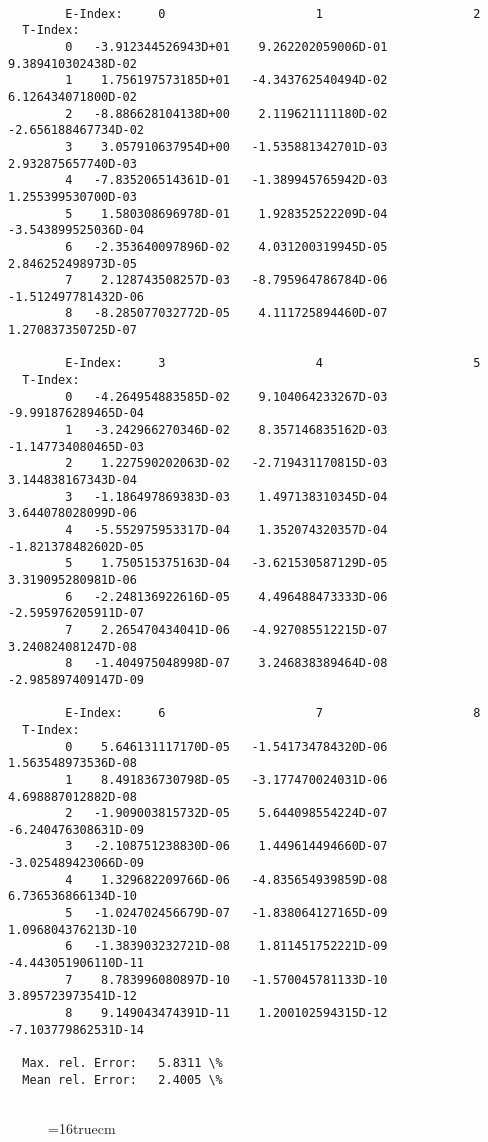 \documentclass[12pt,dvipdfmx]{article}
\begin{document}
\begin{small}\begin{verbatim}

        E-Index:     0                     1                     2
  T-Index:
        0   -3.912344526943D+01    9.262202059006D-01    9.389410302438D-02
        1    1.756197573185D+01   -4.343762540494D-02    6.126434071800D-02
        2   -8.886628104138D+00    2.119621111180D-02   -2.656188467734D-02
        3    3.057910637954D+00   -1.535881342701D-03    2.932875657740D-03
        4   -7.835206514361D-01   -1.389945765942D-03    1.255399530700D-03
        5    1.580308696978D-01    1.928352522209D-04   -3.543899525036D-04
        6   -2.353640097896D-02    4.031200319945D-05    2.846252498973D-05
        7    2.128743508257D-03   -8.795964786784D-06   -1.512497781432D-06
        8   -8.285077032772D-05    4.111725894460D-07    1.270837350725D-07

        E-Index:     3                     4                     5
  T-Index:
        0   -4.264954883585D-02    9.104064233267D-03   -9.991876289465D-04
        1   -3.242966270346D-02    8.357146835162D-03   -1.147734080465D-03
        2    1.227590202063D-02   -2.719431170815D-03    3.144838167343D-04
        3   -1.186497869383D-03    1.497138310345D-04    3.644078028099D-06
        4   -5.552975953317D-04    1.352074320357D-04   -1.821378482602D-05
        5    1.750515375163D-04   -3.621530587129D-05    3.319095280981D-06
        6   -2.248136922616D-05    4.496488473333D-06   -2.595976205911D-07
        7    2.265470434041D-06   -4.927085512215D-07    3.240824081247D-08
        8   -1.404975048998D-07    3.246838389464D-08   -2.985897409147D-09

        E-Index:     6                     7                     8
  T-Index:
        0    5.646131117170D-05   -1.541734784320D-06    1.563548973536D-08
        1    8.491836730798D-05   -3.177470024031D-06    4.698887012882D-08
        2   -1.909003815732D-05    5.644098554224D-07   -6.240476308631D-09
        3   -2.108751238830D-06    1.449614494660D-07   -3.025489423066D-09
        4    1.329682209766D-06   -4.835654939859D-08    6.736536866134D-10
        5   -1.024702456679D-07   -1.838064127165D-09    1.096804376213D-10
        6   -1.383903232721D-08    1.811451752221D-09   -4.443051906110D-11
        7    8.783996080897D-10   -1.570045781133D-10    3.895723973541D-12
        8    9.149043474391D-11    1.200102594315D-12   -7.103779862531D-14

  Max. rel. Error:   5.8311 \%
  Mean rel. Error:   2.4005 \%


\end{verbatim}\end{small}
\begin{figure} \label{2.2.5c}
\epsfxsize=16truecm
\end{figure}
\newpage
\end{document}
